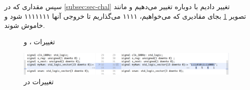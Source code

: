 \documentclass[dvipsnames, svgnames, x11names, a4paper, 11pt]{article}
\begin{document}
سپس مقداری که در 
\ref{subsec:sec-chal}
تغییر دادیم با دوباره تغییر می‌دهیم و مانند تصویر
\ref{fig:sseg-changes}
بجای مقادیری که می‌خواهیم، ۱۱۱۱ می‌گذاریم تا خروجی آنها ۱۱۱۱۱۱۱ شود و خاموش شوند.
\begin{figure}[b]
\begin{center}
\hspace{3mm}
\hspace{3mm}
\end{center}
\caption{تغییرات ،  و }
\end{figure}

\begin{figure}[b]
\begin{center}
\includegraphics[width=0.90\textheight, height=0.148\textwidth, angle=90]{./images/sseg-changes}
\end{center}
\caption{تغییرات در }
\label{fig:sseg-changes}
\end{figure}
\listoffigures
\end{document}
